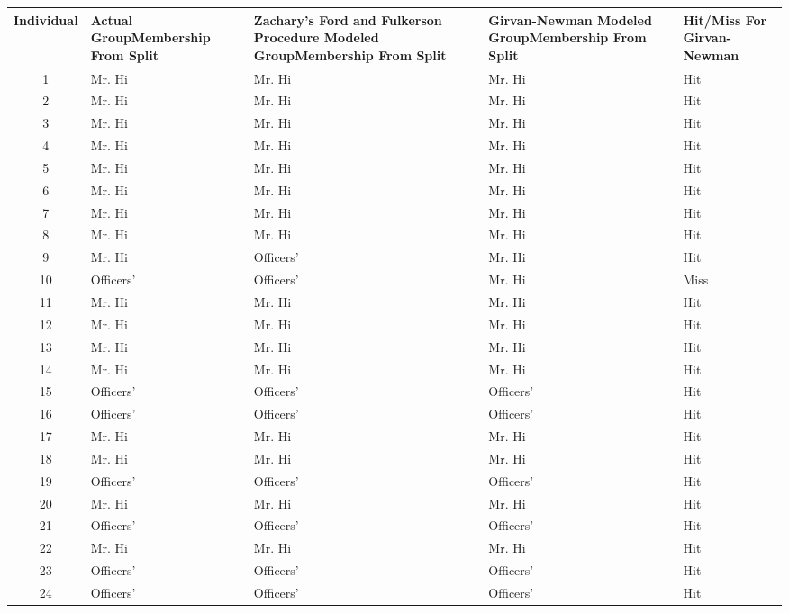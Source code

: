 \documentclass[letterpaper,11pt]{article}
\begin{document}
\begin{table}
\small
\begin{tabular}{ | c | p{2cm} | p{2cm} | p{2cm} | p{2cm} | }
\hline
Individual & Actual Group\newline Membership From Split & Zachary's Ford and Fulkerson Procedure Modeled Group\newline Membership From Split & Girvan-Newman Modeled Group\newline Membership From Split & Hit/Miss For Girvan-Newman\\
\hline
1 & Mr. Hi & Mr. Hi & Mr. Hi & Hit \\
\hline
2 & Mr. Hi & Mr. Hi & Mr. Hi & Hit \\
\hline
3 & Mr. Hi & Mr. Hi & Mr. Hi & Hit \\
\hline
4 & Mr. Hi & Mr. Hi & Mr. Hi & Hit \\
\hline
5 & Mr. Hi & Mr. Hi & Mr. Hi & Hit \\
\hline
6 & Mr. Hi & Mr. Hi & Mr. Hi & Hit \\
\hline
7 & Mr. Hi & Mr. Hi & Mr. Hi & Hit \\
\hline
8 & Mr. Hi & Mr. Hi & Mr. Hi & Hit \\
\hline
9 & Mr. Hi & Officers' & Mr. Hi & Hit \\
\hline
10 & Officers' & Officers' & Mr. Hi & Miss \\
\hline
11 & Mr. Hi & Mr. Hi & Mr. Hi & Hit \\
\hline
12 & Mr. Hi & Mr. Hi & Mr. Hi & Hit \\
\hline
13 & Mr. Hi & Mr. Hi & Mr. Hi & Hit \\
\hline
14 & Mr. Hi & Mr. Hi & Mr. Hi & Hit \\
\hline
15 & Officers' & Officers' & Officers' & Hit \\
\hline
16 & Officers' & Officers' & Officers' & Hit \\
\hline
17 & Mr. Hi & Mr. Hi & Mr. Hi & Hit \\
\hline
18 & Mr. Hi & Mr. Hi & Mr. Hi & Hit \\
\hline
19 & Officers' & Officers' & Officers' & Hit \\
\hline
20 & Mr. Hi & Mr. Hi & Mr. Hi & Hit \\
\hline
21 & Officers' & Officers' & Officers' & Hit \\
\hline
22 & Mr. Hi & Mr. Hi & Mr. Hi & Hit \\
\hline
23 & Officers' & Officers' & Officers' & Hit \\
\hline
24 & Officers' & Officers' & Officers' & Hit \\

\end{tabular}
\end{table}
\end{document}
